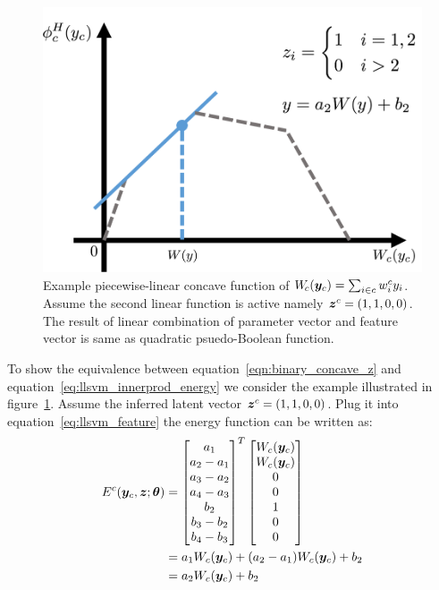 \begin{figure}[t]
  \centering
  \includegraphics[width=0.8\columnwidth]{Methodology/figures/linEnvLatentFig.png}
  \caption{\label{fig:concave} Example piecewise-linear concave
    function of $W_{\!c}({\bm{y}}_c) = \sum_{i \in c} w^c_i y_i$.
    Assume the second linear function is active namely
    ${\bm{z}}^c=(1,1,0,0)$. The result of linear combination of
    parameter vector and feature vector is same as quadratic
    psuedo-Boolean function.}
\end{figure}

To show the equivalence between
equation~\eqref{eqn:binary_concave_z} and
equation~\eqref{eq:llsvm_innerprod_energy} we consider the
example illustrated in figure~\ref{fig:concave}. Assume the
inferred latent vector ${\bm{z}}^c=(1,1,0,0)$. Plug it into
equation~\eqref{eq:llsvm_feature} the energy function can be
written as:
\begin{align*}
  E^c({\bm{y}}_c,{\bm{z}}; {\bm{\theta}}) &=
  \begin{bmatrix}
    a_1\\
    a_2-a_1\\
    a_3-a_2\\
    a_4-a_3\\
    b_2\\
    b_3-b_2\\
    b_4-b_3
  \end{bmatrix}^T
  \begin{bmatrix}
    W_c({\bm{y}}_c) \\
    W_c({\bm{y}}_c) \\
    0\\
    0\\
    1\\
    0\\
    0
  \end{bmatrix}\\
  &=a_1W_c({\bm{y}}_c)+(a_2-a_1)W_c({\bm{y}}_c)+b_2\\
  &=a_2W_c({\bm{y}}_c)+b_2
\end{align*}

